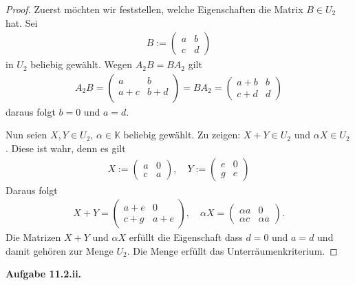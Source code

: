 \documentclass[12pt]{extarticle}
\newcommand{\mg}[1]{\mathbb{#1}}
\newcommand{\aufgn}[1]{\textbf{Aufgabe #1.}}
\begin{document}
\begin{proof}
Zuerst möchten wir feststellen, welche Eigenschaften die
Matrix \(B \in U_2\) hat.  Sei
\begin{align*}
B :=
  \begin{pmatrix}
    a & b\\
    c & d
  \end{pmatrix}
\end{align*}
in \(U_2\) beliebig gewählt. Wegen \(A_2B=BA_2\) gilt
\begin{align*}
A_2B=
\begin{pmatrix}
  a & b \\
  a+c & b+d\\
\end{pmatrix} =
  BA_2 =
\begin{pmatrix}
  a+b & b \\
  c+d & d
\end{pmatrix}
\end{align*}
daraus folgt \(b=0\) und \(a = d\).

Nun seien  \(X, Y \in U_2\), \(\alpha \in \mg{K}\) beliebig
gewählt.  Zu zeigen: \(X + Y \in U_2\) und $\alpha X \in
U_2$.  Diese ist wahr, denn es gilt
\begin{align*}
X :=
  \begin{pmatrix}
    a & 0 \\
    c & a
  \end{pmatrix}, \quad
Y:=
\begin{pmatrix}
  e & 0 \\
  g & e
\end{pmatrix}
\end{align*}
Daraus folgt
\begin{align*}
X + Y =
\begin{pmatrix}
  a + e & 0 \\
  c + g & a + e
\end{pmatrix}, \quad
  \alpha X =
  \begin{pmatrix}
    \alpha a & 0 \\
    \alpha c & \alpha a
  \end{pmatrix}.
\end{align*}
Die Matrizen \(X + Y\) und \(\alpha X\)  erfüllt die
Eigenschaft dass \(d = 0\) und \(a = d\) und damit gehören
zur Menge \(U_2\).  Die Menge erfüllt das Unterräumenkriterium.
\end{proof}

\aufgn{11.2.ii}
\end{document}

